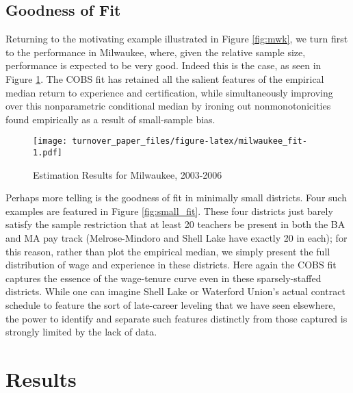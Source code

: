 \documentclass[12pt,]{article}
\begin{document}
\subsection{Goodness of Fit}\label{goodness-of-fit}

Returning to the motivating example illustrated in Figure \ref{fig:mwk},
we turn first to the performance in Milwaukee, where, given the relative
sample size, performance is expected to be very good. Indeed this is the
case, as seen in Figure \ref{fig:mwk_fit}. The COBS fit has retained all
the salient features of the empirical median return to experience and
certification, while simultaneously improving over this nonparametric
conditional median by ironing out nonmonotonicities found empirically as
a result of small-sample bias.

\begin{figure}[htbp]
\centering
\texttt{[image: turnover\_paper\_files/figure-latex/milwaukee\_fit-1.pdf]}
\caption{\label{fig:mwk_fit}Estimation Results for Milwaukee, 2003-2006}
\end{figure}

Perhaps more telling is the goodness of fit in minimally small
districts. Four such examples are featured in Figure
\ref{fig:small_fit}. These four districts just barely satisfy the sample
restriction that at least 20 teachers be present in both the BA and MA
pay track (Melrose-Mindoro and Shell Lake have exactly 20 in each); for
this reason, rather than plot the empirical median, we simply present
the full distribution of wage and experience in these districts. Here
again the COBS fit captures the essence of the wage-tenure curve even in
these sparsely-staffed districts. While one can imagine Shell Lake or
Waterford Union's actual contract schedule to feature the sort of
late-career leveling that we have seen elsewhere, the power to identify
and separate such features distinctly from those captured is strongly
limited by the lack of data.

\section{Results}\label{results}
\end{document}
